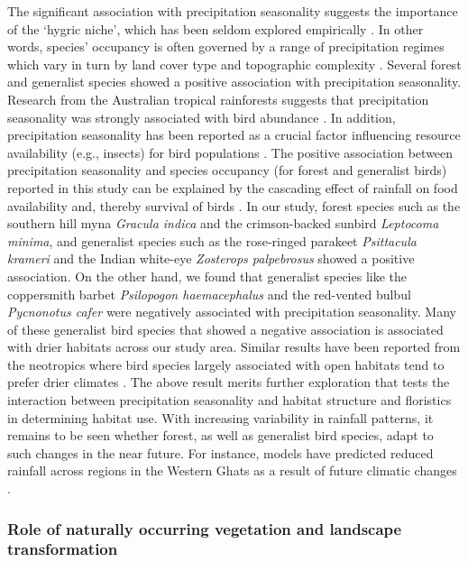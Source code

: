 The significant association with precipitation seasonality suggests the importance of the `hygric niche', which has been seldom explored empirically \citep{boyle2020}.
In other words, species' occupancy is often governed by a range of precipitation regimes which vary in turn by land cover type and topographic complexity \citep{nowakowski2018}.
Several forest and generalist species showed a positive association with precipitation seasonality.
Research from the Australian tropical rainforests suggests that precipitation seasonality was strongly associated with bird abundance \citep{williams2008}.
In addition, precipitation seasonality has been reported as a crucial factor influencing resource availability (e.g., insects) for bird populations \citep{loiselle1991}.
The positive association between precipitation seasonality and species occupancy (for forest and generalist birds) reported in this study can be explained by the cascading effect of rainfall on food availability and, thereby survival of birds \citep{butt2015,boyle2020}.
In our study, forest species such as the southern hill myna \textit{Gracula indica} and the crimson-backed sunbird \textit{Leptocoma minima}, and generalist species such as the rose-ringed parakeet \textit{Psittacula krameri} and the Indian white-eye \textit{Zosterops palpebrosus} showed a positive association.
On the other hand, we found that generalist species like the coppersmith barbet \textit{Psilopogon haemacephalus} and the red-vented bulbul \textit{Pycnonotus cafer} were negatively associated with precipitation seasonality.
Many of these generalist bird species that showed a negative association is associated with drier habitats across our study area.
Similar results have been reported from the neotropics where bird species largely associated with open habitats tend to prefer drier climates \citep{frishkoff2016}.
The above result merits further exploration that tests the interaction between precipitation seasonality and habitat structure and floristics in determining habitat use.
With increasing variability in rainfall patterns, it remains to be seen whether forest, as well as generalist bird species, adapt to such changes in the near future.
For instance, models have predicted reduced rainfall across regions in the Western Ghats as a result of future climatic changes \citep{rajendran2012}.

\subsubsection*{Role of naturally occurring vegetation and landscape transformation}

